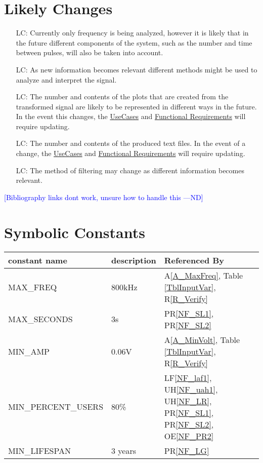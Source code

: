 \documentclass[12pt]{article}
\newcommand{\authornote}[3]{\textcolor{#1}{[#3 ---#2]}}
\newcommand{\authornote}[3]{}
\newcommand{\nd}[1]{\authornote{blue}{ND}{#1}}
\newcounter{lcnum} %
\begin{document}
\section{Likely Changes}    

\noindent \begin{itemize}

\item[LC\refstepcounter{lcnum}\thelcnum\label{LC_comp}:] Currently only
  frequency is being analyzed, however it is likely that in the future different
  components of the system, such as the number and time between pulses, will
  also be taken into account.
\item[LC\refstepcounter{lcnum}\thelcnum\label{LC_signal}:] As new information
  becomes relevant different methods might be used to analyze and interpret the
  signal.
\item[LC\refstepcounter{lcnum}\thelcnum\label{LC_plot}:] The number and 
contents of the plots that are created from the transformed signal are likely 
to be represented in different ways in the future. In the event this changes,
the \hyperref[UseCase]{UseCases} and \hyperref[Func]{Functional Requirements}
will require updating.
\item[LC\refstepcounter{lcnum}\thelcnum\label{LC_output}:]The number and 
contents of the produced text files. In the event of a change,
the \hyperref[UseCase]{UseCases} and \hyperref[Func]{Functional Requirements}
will require updating.
\item[LC\refstepcounter{lcnum}\thelcnum\label{LC_filter}:] The method of 
filtering may change as different information becomes relevant.
\end{itemize}
\newpage




\nd{Bibliography links dont work, unsure how to handle this}
\appendix

\section{Symbolic Constants} \label{AppendA}

\renewcommand{\arraystretch}{1.2}
\begin{tabular}{l l l}
  \toprule		
  \textbf{constant name} & \textbf{description} & \textbf{Referenced By}\\
  \midrule 
  MAX\_FREQ					&	800kHz		& A\ref{A_MaxFreq}, Table \ref{TblInputVar}, 
R\ref{R_Verify}\\
  MAX\_SECONDS				&	3s			& PR\ref{NF_SL1}, PR\ref{NF_SL2}\\
  MIN\_AMP					&	0.06V		& A\ref{A_MinVolt}, Table \ref{TblInputVar}, 
R\ref{R_Verify}\\
  MIN\_PERCENT\_USERS		&	80\%		& LF\ref{NF_laf1}, UH\ref{NF_uah1}, 
UH\ref{NF_LR}, PR\ref{NF_SL1}, PR\ref{NF_SL2}, OE\ref{NF_PR2}\\
  MIN\_LIFESPAN				&	3 years		& PR\ref{NF_LG}\\
  \bottomrule
\end{tabular}\\
\end{document}
